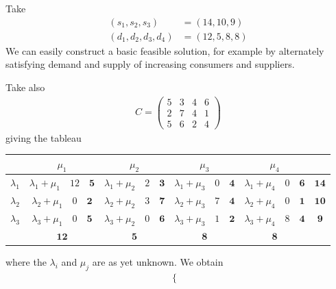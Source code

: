 \documentclass{../../template/note}
\begin{document}
    \begin{example*}
        Take
        \begin{align*}
            (s_1, s_2, s_3) &= (14, 10, 9) \\
            (d_1, d_2, d_3, d_4) &= (12, 5, 8, 8)
        \end{align*}
        We can easily construct a basic feasible solution, for example by alternately satisfying demand and supply of increasing consumers and suppliers.

        Take also
        \begin{align*}
            C = \begin{pmatrix}
                5 & 3 & 4 & 6 \\
                2 & 7 & 4 & 1 \\
                5 & 6 & 2 & 4
            \end{pmatrix}
        \end{align*}
        giving the tableau
        \begin{center}    
            \begin{tabular}{| c | c c c c | c |}
                \hline
                & $\mu_1$ & $\mu_2$ & $\mu_3$ & $\mu_4$ &  \\
                \hline
                $\lambda_1$ & $\lambda_1 + \mu_1 \quad 12 \quad \mathbf{5}$ & $\lambda_1 + \mu_2 \quad 2 \quad \mathbf{3}$ & $\lambda_1 + \mu_3 \quad 0 \quad \mathbf{4}$ & $\lambda_1 + \mu_4 \quad 0 \quad \mathbf{6}$ & $\mathbf{14}$ \\
                $\lambda_2$ & $\lambda_2 + \mu_1 \quad 0 \quad \mathbf{2}$ & $\lambda_2 + \mu_2 \quad 3 \quad \mathbf{7}$ & $\lambda_2 + \mu_3 \quad 7 \quad \mathbf{4}$ & $\lambda_2 + \mu_4 \quad 0 \quad \mathbf{1}$ & $\mathbf{10}$ \\
                $\lambda_3$ & $\lambda_3 + \mu_1 \quad 0 \quad \mathbf{5}$ & $\lambda_3 + \mu_2 \quad 0 \quad \mathbf{6}$ & $\lambda_3 + \mu_3 \quad 1 \quad \mathbf{2}$ & $\lambda_3 + \mu_4 \quad 8 \quad \mathbf{4}$ & $\mathbf{9}$ \\
                \hline
                & $\mathbf{12}$ & $\mathbf{5}$ & $\mathbf{8}$ & $\mathbf{8}$ & \\
                \hline
            \end{tabular}        
        \end{center}   
        where the $\lambda_i$ and $\mu_j$ are as yet unknown. We obtain
        \begin{align*}
            \begin{cases}

\end{cases}
\end{align*}
\end{example*}
\end{document}
